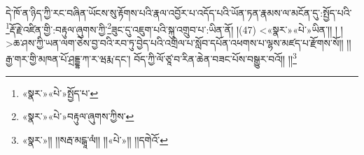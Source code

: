 དེ་ཁོ་ན་ཉིད་ཀྱི་རང་བཞིན་ཡོངས་སུ་རྟོགས་པའི་རྣལ་འབྱོར་པ་འདོད་པའི་ཡོན་ཏན་རྣམས་ལ་མངོན་དུ་:སྤྱོད་པའི་\footnote{«སྣར་»«པེ་»སྤྱོད་པ་}རྡོ་རྗེ་འཛིན་གྱི་:བརྟུལ་ཞུགས་ཀྱི་\footnote{«སྣར་»«པེ་»བརྟུལ་ཞུགས་ཀྱིས་}ཟུང་དུ་འཇུག་པའི་སྐུ་འགྲུབ་པ་:ཡིན་ནོ། །(47) <«སྣར་»«པེ་»ཡིན་།། །
།>ཆ་ཤས་ཀྱི་ཡན་ལག་ཅེས་བྱ་བའི་རབ་ཏུ་བྱེད་པའི་འགྲེལ་པ་སློབ་དཔོན་འཕགས་པ་ལྷས་མཛད་པ་རྫོགས་སོ།། །།རྒྱ་གར་གྱི་མཁན་པོ་ཤྲདྡྷ་ཀ་ར་ཝརྨ་དང་། བོད་ཀྱི་ལོ་ཙཱ་བ་རིན་ཆེན་བཟང་པོས་བསྒྱུར་བའོ།། །།\footnote{«སྣར་»།། །།སརྦ་མངྒཱ་ལཾ།། །།«པེ་»།། །།དགེའོ་}